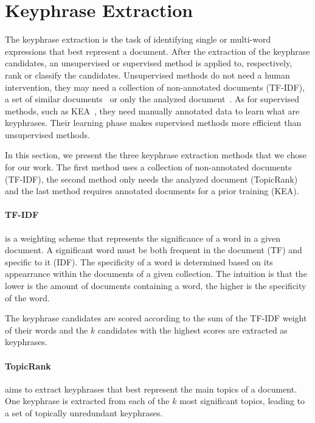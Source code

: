 \section{Keyphrase Extraction}
\label{sec:keyphrase_extraction}
  The keyphrase extraction is the task of identifying single or multi-word
  expressions that best represent a document. After the extraction of the
  keyphrase candidates, an unsupervised or supervised method is applied to,
  respectively, rank or classify the candidates. Unsupervised methods do not
  need a human intervention, they may need a collection of non-annotated
  documents (TF-IDF), a set of similar
  documents~\cite[ExpandRank]{wan2008expandrank} or only the analyzed
  document~\cite[TopicRank]{bougouin2013topicrank}. As for supervised methods,
  such as KEA~\cite{witten1999kea}, they need manually annotated data to learn
  what are keyphrases. Their learning phase makes supervised methods more
  efficient than unsupervised methods.

  In this section, we present the three keyphrase extraction methods that we
  chose for our work. The first method uses a collection of non-annotated
  documents (TF-IDF), the second method only needs the analyzed document
  (TopicRank) and the last method requires annotated documents for a prior
  training (KEA).

  \paragraph{TF-IDF~\textnormal{\cite{jones1972tfidf}}} is a weighting scheme
  that represents the significance of a word in a given document. A significant
  word must be both frequent in the document (TF) and specific to it (IDF). The
  specificity of a word is determined based on its appearrance within the
  documents of a given collection. The intuition is that the lower is the amount
  of documents containing a word, the higher is the specificity of the word.

  The keyphrase candidates are scored according to the sum of the TF-IDF weight
  of their words and the $k$ candidates with the highest scores are extracted as
  keyphrases.

  \paragraph{TopicRank~\textnormal{\cite{bougouin2013topicrank}}} aims to
  extract keyphrases that best represent the main topics of a document. One
  keyphrase is extracted from each of the $k$ most significant topics, leading
  to a set of topically unredundant keyphrases.


